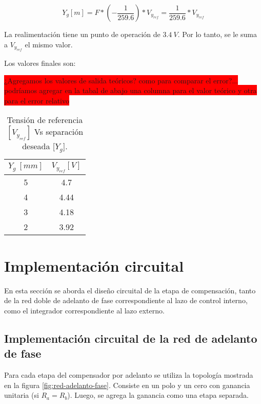\begin{equation} 
	Y_g[m] = F * (-\frac{1}{259.6})*V_{y_{ref}} =\frac{1}{259.6}*V_{y_{ref}} 
\end{equation}

\noindent La realimentación tiene un punto de operación de $3.4\:V$. Por lo tanto, se le suma a $V_{y_{ref}}$ el mismo valor.

\noindent Los valores finales son:

\colorbox{red}{¿Agregamos los valores de salida teóricos? como para comparar el error?... podríamos agregar en la tabal de abajo una columna para el valor teórico y otra para el error relativo}


\begin{table}[H]
	\begin{center}
		\begin{tabular}{| c | c |}
			\hline
			$Y_g\:[mm]$ & $V_{y_{ref}}[V]$\\ \hline
			5 & 4.7\\ \hline
			4 & 4.44 \\ \hline
			3 & 4.18\\ \hline
			2 &	3.92 \\ \hline		
		\end{tabular}
		\caption{Tensión de referencia $[V_{y_{ref}}]$ Vs separación deseada [$Y_g$].}
		\label{tension-ref-vs-separacion-deseada}
	\end{center}
\end{table}

\section{Implementación circuital}

En esta sección se aborda el diseño circuital de la etapa de compensación, tanto de la red doble de adelanto de fase correspondiente al lazo de control interno, como el integrador correspondiente al lazo externo.

\subsection{Implementación circuital de la red de adelanto de fase}

\noindent Para cada etapa del compensador por adelanto se utiliza la topología mostrada en la figura \ref{fig:red-adelanto-fase}. Consiste en  un polo y un cero con ganancia unitaria (si $R_a = R_b$). Luego, se agrega la ganancia como una etapa separada.


